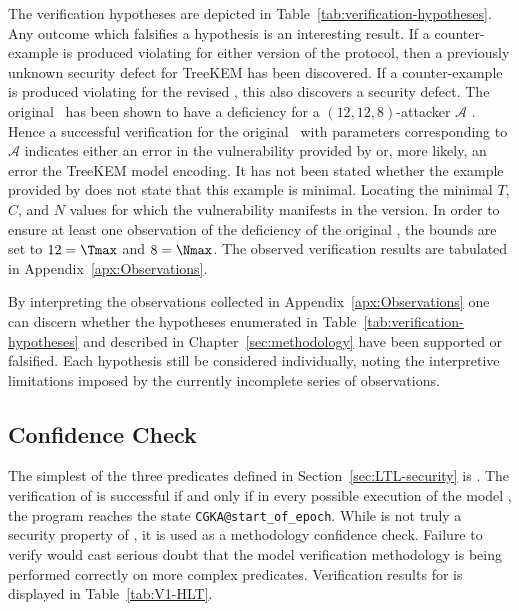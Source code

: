 The verification hypotheses are depicted in Table\ \ref{tab:verification-hypotheses}.
Any outcome which falsifies a hypothesis is an interesting result.
If a counter-example is produced violating  for either version of the protocol, then a previously unknown security defect for TreeKEM has been discovered.
If a counter-example is produced violating  for the revised \VersionTwo, this also discovers a security defect.
The original \VersionOne\ has been shown to have a  deficiency for a \((12, 12, 8)\)-attacker \(\mathcal{A}\) \autocite{alwen2020security}.
Hence a successful  verification for the original \VersionOne\ with parameters corresponding to \(\mathcal{A}\) indicates either an error in the vulnerability provided by \autocite{alwen2020security} or, more likely, an error the TreeKEM model encoding.
It has not been stated whether the example provided by \autocite{alwen2020security} does not state that this example is minimal.
Locating the minimal \(T\), \(C\), and \(N\) values for which the vulnerability manifests in the \VersionOne version.
In order to ensure at least one observation of the  deficiency of the original \VersionOne, the bounds are set to \(12 = \Tmax\) and \(8 = \Nmax\).
The observed verification results are tabulated in Appendix\ \ref{apx:Observations}.

By interpreting the observations collected in Appendix\ \ref{apx:Observations} one can discern whether the hypotheses enumerated in Table\ \ref{tab:verification-hypotheses} and described in Chapter\ \ref{sec:methodology} have been supported or falsified.
Each hypothesis still be considered individually, noting the interpretive limitations imposed by the currently incomplete series of observations.


\hypertarget{sec:confidence-check}{%
\subsection{Confidence Check}\label{sec:confidence-check}}

The simplest of the three  predicates defined in Section\ \ref{sec:LTL-security} is .
The verification of  is successful if and only if in every possible execution of the model \CGKAmod{}{}{}, the program reaches the state \texttt{CGKA@start\_of\_epoch}.
While  is not truly a security property of \CGKAmod{}{}{}, it is used as a methodology confidence check.
Failure to verify  would cast serious doubt that the model verification methodology is being performed correctly on more complex  predicates.
Verification results for  is displayed in Table\ \ref{tab:V1-HLT}.


